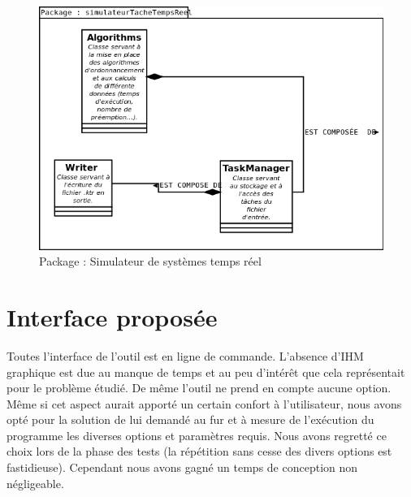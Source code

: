    \begin{figure}[htbp]
  \centering
  \includegraphics[scale=0.70]{img/packsstr}
  \caption{Package : Simulateur de systèmes temps réel}
  \label{fig:sstr}
\end{figure}
\section{Interface proposée}
Toutes l'interface de l'outil est en ligne de commande. L'absence d'IHM graphique est due au manque de temps et au peu d'intérêt que cela représentait pour le problème étudié. De même l'outil ne prend en compte aucune option. Même si cet aspect aurait apporté un certain confort à l'utilisateur, nous avons opté pour la solution de lui demandé au fur et à mesure de l'exécution du programme les diverses options et paramètres requis. Nous avons regretté ce choix lors de la phase des tests (la répétition sans cesse des divers options est fastidieuse). Cependant nous avons gagné un temps de conception non négligeable. 


